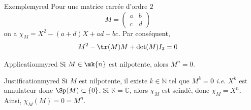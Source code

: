     \begin{omed}{Exemple}{myred}
        Pour une matrice carrée d’ordre $2$ 
        \[ M = \begin{pmatrix}
            a & b \\
            c & d
        \end{pmatrix} \]  
        on a $\chi_M = X^2 - (a+d)X + ad - bc$. Par conséquent, 
        \[ M^2 - \tr(M) M + \det(M) I_2 = 0 \]
    \end{omed}

    \begin{omed}{Application}{myred}
        Si $M \in \mk{n}$ est nilpotente, alors $M^n = 0$.
    \end{omed}

    \begin{demo}{Justification}{myred}
        Si $M$ est nilpotente, il existe $k \in \mathbb{N}$ tel que $M^k = 0$ \textit{i.e.} $X^k$ est annulateur donc $\Sp(M) \subset \left\{0\right\}$. Si $\mathbb{K} = \mathbb{C}$, alors $\chi_M$ est scindé, donc $\chi_M = X^n$. Ainsi, $\chi_M(M) = 0 = M^n$.
    \end{demo}
